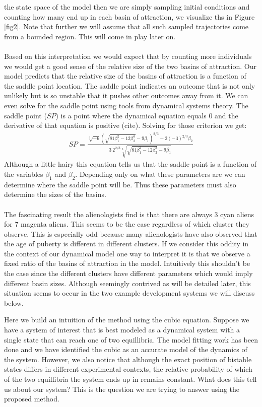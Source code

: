 \documentclass[letterpaper]{article}
\begin{document}
the state space of the model then we are simply sampling initial conditions and counting
how many end up in each basin of attraction, we visualize ths in Figure \ref{fig2}. Note
that further we will assume that all such sampled trajectories come from a bounded region.
This will come in play later on.\\\\
Based on this interpretation we would expect that by counting more individuals we would
get a good sense of the relative size of the two basins of attraction. Our model
predicts that the relative size of the basins of attraction is a function of the saddle
point location. The saddle point indicates an outcome that is not only unlikely but is
so unstable that it pushes other outcomes away from it. We can even solve for the saddle
point using tools from dynamical systems theory. The saddle point ($SP$) is a point where the
  dynamical equation equals 0 and the derivative of that equation is positive (cite).
  Solving for those criterion we get:
\begin{eqnarray}
SP = \frac{\sqrt[3]{-6} 
\left(\sqrt{81 \beta_1^2-12 \beta_2^3}-9 \beta_1\right)^{2/3}-2 (-3)^{2/3} \beta_2}{3\ 2^{2/3} \sqrt[3]{\sqrt{81 \beta_1^2-12 \beta_2^3}-9 \beta_1}}
\end{eqnarray}
Although a little hairy this equation tells us that the saddle point is a function of
the variables $\beta_1$ and $\beta_2$. Depending only on what these parameters are we
can determine where the saddle point will be. Thus these parameters must also determine
the sizes of the basins.\\\\
The fascinating result the alienologists find is that there
are always 3 cyan aliens for 7 magenta aliens. This seems to be the case regardless
of which cluster they observe. This is especially odd because many alienologists have
also observed that the age of puberty is different in different clusters.
If we consider this oddity in the context of our dynamical
model one way to interpret it is that we observe a fixed ratio of the basins of
attraction in the model. Intuitively this shouldn't be the case since the different
clusters have different parameters which would imply different basin sizes. Although
seemingly contrived as will be detailed later, this situation seems to occur in the two
example development systems we will discuss below.


Here we build an intuition of the method using the cubic equation. Suppose
we have a system of interest that is best modeled as a dynamical system
with a single state that can reach one of two equillibria. The model
fitting work has been done and we have identified the cubic as an 
accurate model of the dynamics of the system. However, we also notice
that although the exact position of bistable states differs in different
experimental contexts, the relative probability of which of the two
equillibria the system ends up in remains constant. What does this 
tell us about our system?
This is the question we are trying to answer using the proposed method.\\
\end{document}
